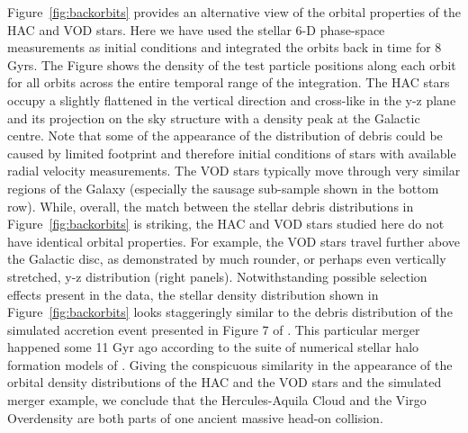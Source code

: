 \documentclass[fleqn,usenatbib]{mnras}
\begin{document}
Figure~\ref{fig:backorbits} provides an alternative view of the
orbital properties of the HAC and VOD stars. Here we have used the
stellar 6-D phase-space measurements as initial conditions and
integrated the orbits back in time for 8 Gyrs. The Figure shows the
density of the test particle positions along each orbit for all orbits
across the entire temporal range of the integration. The HAC stars
occupy a slightly flattened in the vertical direction and cross-like in
the y-z plane and its projection on the sky structure
with a density peak at the Galactic centre. Note that some of the
appearance of the distribution of debris could be caused by limited
footprint and therefore initial conditions of stars with available radial velocity
measurements. The VOD stars typically move through very similar
regions of the Galaxy (especially the sausage sub-sample shown in the
bottom row). While, overall, the match between the stellar debris
distributions in Figure~\ref{fig:backorbits} is striking, the HAC and
VOD stars studied here do not have identical orbital properties. For
example, the VOD stars travel further above the Galactic disc, as
demonstrated by much rounder, or perhaps even vertically stretched, y-z
distribution (right panels).
%
Notwithstanding possible selection effects present in the data, the
stellar density distribution shown in Figure~\ref{fig:backorbits}
looks staggeringly similar to the debris distribution of the simulated
accretion event presented in Figure 7 of \citet{Simion2018}. This
particular merger happened some 11 Gyr ago according to the suite of
numerical stellar halo formation models of \citet{Bu05}. Giving the
conspicuous similarity in the appearance of the orbital density
distributions of the HAC and the VOD stars and the simulated merger
example, we conclude that the Hercules-Aquila Cloud and the Virgo
Overdensity are both parts of one ancient massive head-on collision.
%
%
\end{document}
